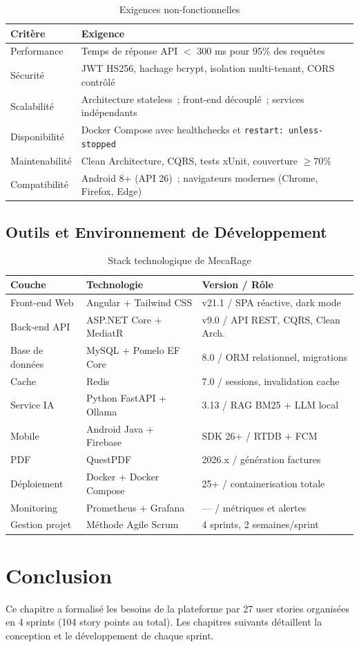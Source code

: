 \begin{table}[H]
\centering
\caption{Exigences non-fonctionnelles}
\label{tab:enf}
\begin{tabularx}{\textwidth}{|l|X|}
\hline
\rowcolor{gray!15}
\textbf{Critère} & \textbf{Exigence} \\
\hline
Performance & Temps de réponse API $<$ 300 ms pour 95\% des requêtes \\[2pt]\hline
Sécurité & JWT HS256, hachage bcrypt, isolation multi-tenant, CORS contrôlé \\[2pt]\hline
Scalabilité & Architecture stateless~; front-end découplé~; services indépendants \\[2pt]\hline
Disponibilité & Docker Compose avec healthchecks et \texttt{restart: unless-stopped} \\[2pt]\hline
Maintenabilité & Clean Architecture, CQRS, tests xUnit, couverture $\geq 70\%$ \\[2pt]\hline
Compatibilité & Android 8+ (API 26)~; navigateurs modernes (Chrome, Firefox, Edge) \\[2pt]\hline
\end{tabularx}
\end{table}

\subsection{Outils et Environnement de Développement}

\begin{table}[H]
\centering
\caption{Stack technologique de MecaRage}
\label{tab:stack}
\begin{tabularx}{\textwidth}{|l|l|X|}
\hline
\rowcolor{gray!15}
\textbf{Couche} & \textbf{Technologie} & \textbf{Version / Rôle} \\
\hline
Front-end Web & Angular + Tailwind CSS & v21.1 / SPA réactive, dark mode \\[2pt]\hline
Back-end API & ASP.NET Core + MediatR & v9.0 / API REST, CQRS, Clean Arch. \\[2pt]\hline
Base de données & MySQL + Pomelo EF Core & 8.0 / ORM relationnel, migrations \\[2pt]\hline
Cache & Redis & 7.0 / sessions, invalidation cache \\[2pt]\hline
Service IA & Python FastAPI + Ollama & 3.13 / RAG BM25 + LLM local \\[2pt]\hline
Mobile & Android Java + Firebase & SDK 26+ / RTDB + FCM \\[2pt]\hline
PDF & QuestPDF & 2026.x / génération factures \\[2pt]\hline
Déploiement & Docker + Docker Compose & 25+ / containerisation totale \\[2pt]\hline
Monitoring & Prometheus + Grafana & --- / métriques et alertes \\[2pt]\hline
Gestion projet & Méthode Agile Scrum & 4 sprints, 2 semaines/sprint \\[2pt]\hline
\end{tabularx}
\end{table}

\section{Conclusion}

Ce chapitre a formalisé les besoins de la plateforme par 27 user stories organisées
en 4 sprints (104 story points au total). Les chapitres suivants détaillent la
conception et le développement de chaque sprint.
